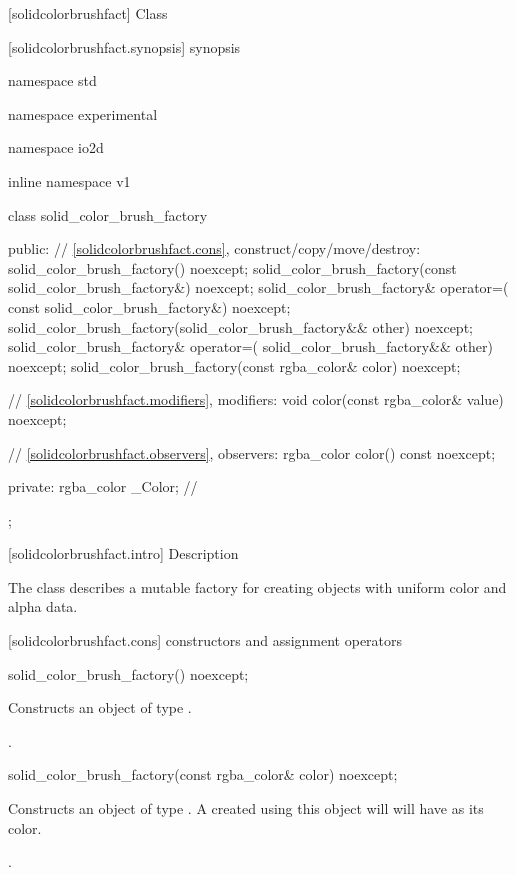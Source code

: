  [solidcolorbrushfact] {Class }

 [solidcolorbrushfact.synopsis] { synopsis}

\begin{codeblock}
namespace std { namespace experimental { namespace io2d { inline namespace v1 {
  class solid_color_brush_factory {
  public:
    // \ref{solidcolorbrushfact.cons}, construct/copy/move/destroy:
    solid_color_brush_factory() noexcept;
    solid_color_brush_factory(const solid_color_brush_factory&) noexcept;
    solid_color_brush_factory& operator=(
      const solid_color_brush_factory&) noexcept;
    solid_color_brush_factory(solid_color_brush_factory&& other) noexcept;
    solid_color_brush_factory& operator=(
      solid_color_brush_factory&& other) noexcept;
    solid_color_brush_factory(const rgba_color& color) noexcept;

    // \ref{solidcolorbrushfact.modifiers}, modifiers:
    void color(const rgba_color& value) noexcept;

    // \ref{solidcolorbrushfact.observers}, observers:
    rgba_color color() const noexcept;
    
  private:
    rgba_color _Color;      // \expos
  };
} } } }
\end{codeblock}

 [solidcolorbrushfact.intro] { Description}

\pnum
{}
The class  describes a mutable factory for creating  objects with uniform color and alpha data.

 [solidcolorbrushfact.cons] { constructors and assignment operators}

\begin{itemdecl}
    solid_color_brush_factory() noexcept;
\end{itemdecl}
\begin{itemdescr}
	\pnum
	\effects
	Constructs an object of type .
	
	\pnum
	\postcondition
	.
	
\end{itemdescr}

\begin{itemdecl}
    solid_color_brush_factory(const rgba_color& color) noexcept;
\end{itemdecl}
\begin{itemdescr}
	\pnum
	\effects
	Constructs an object of type . A  created using this object will will have  as its color.
	
	\pnum
	\postcondition
	.
		
\end{itemdescr}

